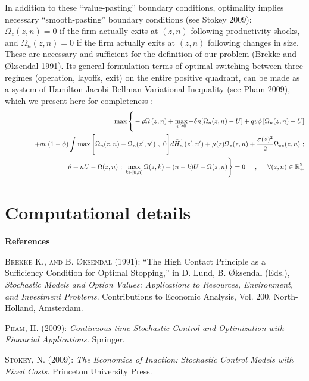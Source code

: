 In addition to these ``value-pasting'' boundary conditions, optimality
implies necessary ``smooth-pasting'' boundary conditions (see Stokey 2009): $%
\Omega_z(z,n) = 0$ if the firm actually exits at $(z,n)$ following
productivity shocks, and $\Omega_n(z,n) = 0$ if the firm actually exits at $%
(z,n)$ following changes in size. These are necessary and sufficient for the
definition of our problem (Brekke and {\O}ksendal 1991). Its general formulation
terms of optimal switching between three regimes (operation, layoffs, exit)
on the entire positive quadrant, can be made as a system of
Hamilton-Jacobi-Bellman-Variational-Inequality (see Pham 2009), which we
present here for completeness :
\begin{eqnarray*}
&& \max \Bigg\{ - \rho \Omega \left(z,n\right) + \max_{v \geq 0} -\delta n
[\Omega_n(z,n) - U] +q v \phi \left[ \Omega_n(z,n) -U \right] \\
&& \hskip1.2cm +q v \left( 1-\phi \right) \int \max\Bigg[\Omega_n(z,n) -
\Omega_n(z^{\prime},n^{\prime}) \ , \ 0 \Bigg]d\widetilde{H_n}\left(
z^{\prime},n^{\prime}\right) +\mu(z) \Omega_z(z,n) + \frac{\sigma(z)^2}{2}
\Omega_{zz}(z,n) \ ; \\
&& \hskip1.3cm \vartheta + n U - \Omega(z,n) \ ; \ \max_{k \in [0,n]}
\Omega(z,k) + (n-k) U - \Omega(z,n) \Bigg\} = 0 \hskip5mm , \hskip5mm
\forall (z,n) \in \mathbb{R}_+^2
\end{eqnarray*}\vspace{.7cm}

\newpage
\section{Computational details}\label{appx:computation}



\bigskip\bigskip

\noindent \textbf{\Large References}\bigskip

\noindent \textsc{Brekke K., and B. {\O}ksendal (1991):} ``The High Contact Principle as a Sufficiency Condition for Optimal Stopping,'' in  D. Lund, B. {\O}ksendal (Eds.), \emph{Stochastic Models and Option Values: Applications to Resources, Environment, and Investment Problems}. Contributions to Economic Analysis, Vol. 200. North-Holland, Amsterdam.\medskip

\noindent \textsc{Pham, H. (2009):} \emph{Continuous-time Stochastic Control and Optimization with Financial Applications.} Springer. \medskip

\noindent \textsc{Stokey, N. (2009):} \emph{The Economics of Inaction: Stochastic Control Models with Fixed Costs.} Princeton University Press.\medskip





